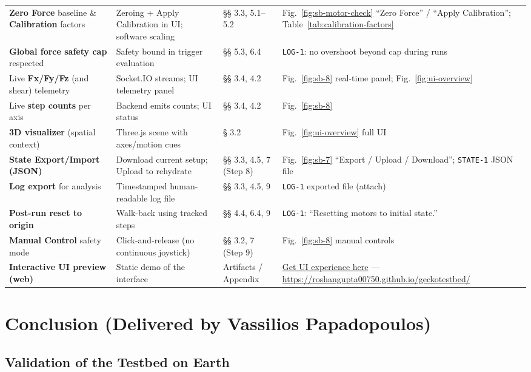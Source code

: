 \documentclass[
    twocolumn,
    fontsize = 10pt,
    parskip = half+,
    headings = small,
    headwidth = text,
    footwidth = text,
]{scrartcl}
\begin{document}
\begin{table}[t]
\begin{tabularx}{\textwidth}{@{}p{}YYY@{}}
\textbf{Zero Force} baseline \& \textbf{Calibration} factors
& Zeroing + Apply Calibration in UI; software scaling
& §§ 3.3, 5.1–5.2
& Fig.~\ref{fig:sb-motor-check} “Zero Force” / “Apply Calibration”; Table~\ref{tab:calibration-factors} \\
\textbf{Global force safety cap} respected
& Safety bound in trigger evaluation
& §§ 5.3, 6.4
& \texttt{LOG-1}: no overshoot beyond cap during runs \\
Live \textbf{Fx/Fy/Fz} (and shear) telemetry
& Socket.IO streams; UI telemetry panel
& §§ 3.4, 4.2
& Fig.~\ref{fig:sb-8} real-time panel; Fig.~\ref{fig:ui-overview} \\
Live \textbf{step counts} per axis
& Backend emits counts; UI status
& §§ 3.4, 4.2
& Fig.~\ref{fig:sb-8} \\
\textbf{3D visualizer} (spatial context)
& Three.js scene with axes/motion cues
& § 3.2
& Fig.~\ref{fig:ui-overview} full UI \\
\textbf{State Export/Import (JSON)}
& Download current setup; Upload to rehydrate
& §§ 3.3, 4.5, 7 (Step 8)
& Fig.~\ref{fig:sb-7} “Export / Upload / Download”; \texttt{STATE-1} JSON file \\
\textbf{Log export} for analysis
& Timestamped human-readable log file
& §§ 3.3, 4.5, 9
& \texttt{LOG-1} exported file (attach) \\
\textbf{Post-run reset to origin}
& Walk-back using tracked steps
& §§ 4.4, 6.4, 9
& \texttt{LOG-1}: “Resetting motors to initial state.” \\
\textbf{Manual Control} safety mode
& Click-and-release (no continuous joystick)
& §§ 3.2, 7 (Step 9)
& Fig.~\ref{fig:sb-8} manual controls \\
\textbf{Interactive UI preview (web)}
& Static demo of the interface
& Artifacts / Appendix
& \href{https://roshangupta00750.github.io/geckotestbed/}{Get UI experience here} — \url{https://roshangupta00750.github.io/geckotestbed/} \\
\bottomrule
\end{tabularx}
\end{table}


\section{Conclusion \textnormal{(Delivered by Vassilios Papadopoulos)}}

\subsection{Validation of the Testbed on Earth}
\end{document}
